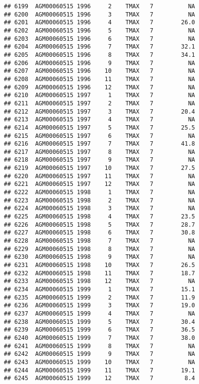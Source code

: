 \documentclass{article}\usepackage[]{graphicx}\usepackage[]{color}
\makeatletter
\newenvironment{kframe}{%
 \def\at@end@of@kframe{}%
 \ifinner\ifhmode%
  \def\at@end@of@kframe{\end{minipage}}%
  \begin{minipage}{\columnwidth}%
 \fi\fi%
 \def\FrameCommand##1{\hskip\@totalleftmargin \hskip-\fboxsep
 \colorbox{shadecolor}{##1}\hskip-\fboxsep
     \hskip-\linewidth \hskip-\@totalleftmargin \hskip\columnwidth}%
 \MakeFramed {\advance\hsize-\width
   \@totalleftmargin\z@ \linewidth\hsize
   \@setminipage}}%
 {\par\unskip\endMakeFramed%
 \at@end@of@kframe}
\newenvironment{knitrout}{}{} %
\makeatother
\begin{document}
\begin{knitrout}
\begin{kframe}
\begin{verbatim}
## 6199  AGM00060515 1996     2    TMAX   7          NA
## 6200  AGM00060515 1996     3    TMAX   7          NA
## 6201  AGM00060515 1996     4    TMAX   7        26.0
## 6202  AGM00060515 1996     5    TMAX   7          NA
## 6203  AGM00060515 1996     6    TMAX   7          NA
## 6204  AGM00060515 1996     7    TMAX   7        32.1
## 6205  AGM00060515 1996     8    TMAX   7        34.1
## 6206  AGM00060515 1996     9    TMAX   7          NA
## 6207  AGM00060515 1996    10    TMAX   7          NA
## 6208  AGM00060515 1996    11    TMAX   7          NA
## 6209  AGM00060515 1996    12    TMAX   7          NA
## 6210  AGM00060515 1997     1    TMAX   7          NA
## 6211  AGM00060515 1997     2    TMAX   7          NA
## 6212  AGM00060515 1997     3    TMAX   7        20.4
## 6213  AGM00060515 1997     4    TMAX   7          NA
## 6214  AGM00060515 1997     5    TMAX   7        25.5
## 6215  AGM00060515 1997     6    TMAX   7          NA
## 6216  AGM00060515 1997     7    TMAX   7        41.8
## 6217  AGM00060515 1997     8    TMAX   7          NA
## 6218  AGM00060515 1997     9    TMAX   7          NA
## 6219  AGM00060515 1997    10    TMAX   7        27.5
## 6220  AGM00060515 1997    11    TMAX   7          NA
## 6221  AGM00060515 1997    12    TMAX   7          NA
## 6222  AGM00060515 1998     1    TMAX   7          NA
## 6223  AGM00060515 1998     2    TMAX   7          NA
## 6224  AGM00060515 1998     3    TMAX   7          NA
## 6225  AGM00060515 1998     4    TMAX   7        23.5
## 6226  AGM00060515 1998     5    TMAX   7        28.7
## 6227  AGM00060515 1998     6    TMAX   7        30.8
## 6228  AGM00060515 1998     7    TMAX   7          NA
## 6229  AGM00060515 1998     8    TMAX   7          NA
## 6230  AGM00060515 1998     9    TMAX   7          NA
## 6231  AGM00060515 1998    10    TMAX   7        26.5
## 6232  AGM00060515 1998    11    TMAX   7        18.7
## 6233  AGM00060515 1998    12    TMAX   7          NA
## 6234  AGM00060515 1999     1    TMAX   7        15.1
## 6235  AGM00060515 1999     2    TMAX   7        11.9
## 6236  AGM00060515 1999     3    TMAX   7        19.0
## 6237  AGM00060515 1999     4    TMAX   7          NA
## 6238  AGM00060515 1999     5    TMAX   7        30.4
## 6239  AGM00060515 1999     6    TMAX   7        36.5
## 6240  AGM00060515 1999     7    TMAX   7        38.0
## 6241  AGM00060515 1999     8    TMAX   7          NA
## 6242  AGM00060515 1999     9    TMAX   7          NA
## 6243  AGM00060515 1999    10    TMAX   7          NA
## 6244  AGM00060515 1999    11    TMAX   7        19.1
## 6245  AGM00060515 1999    12    TMAX   7         8.4

\end{verbatim}
\end{kframe}
\end{knitrout}
\end{document}
